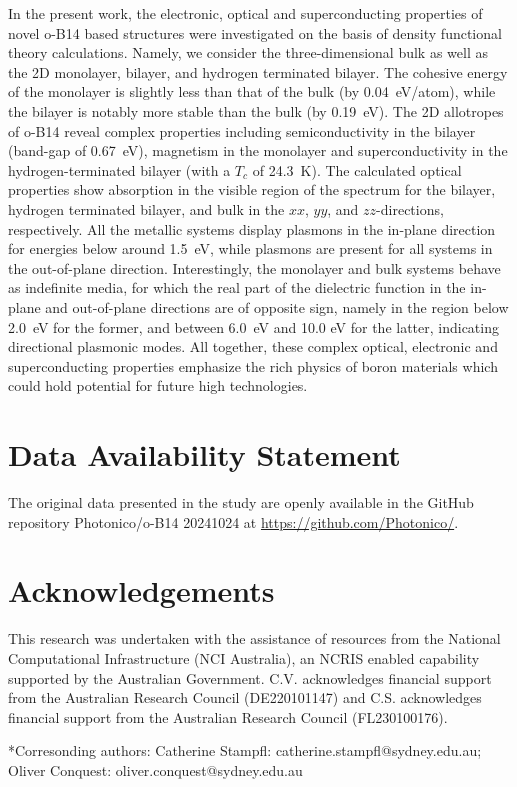 \documentclass[aps,prb,preprint,notitlepage]{revtex4-2}
\begin{document}
In the present work, the electronic, optical and superconducting properties of
novel o-B14 based structures were investigated on the basis of 
density functional theory calculations. Namely, we consider the three-dimensional
bulk as well as the 2D monolayer, bilayer, and 
hydrogen terminated bilayer. 
The cohesive energy of the monolayer is slightly less 
than that of the bulk (by 0.04~eV/atom), while the bilayer is notably more 
stable than the bulk (by 0.19~eV).
The 2D allotropes of o-B14 reveal complex properties including
semiconductivity in the bilayer (band-gap of 0.67~eV), 
magnetism in the monolayer 
and superconductivity in the hydrogen-terminated bilayer (with a $T_c$ of 24.3~K). 
The calculated optical properties show  absorption in the visible region 
of the spectrum for the bilayer, hydrogen terminated bilayer, and bulk in the $xx$, $yy$, and $zz$-directions, respectively.
All the metallic systems display plasmons in the in-plane direction for energies below around 1.5~eV, while plasmons are present for all systems in the out-of-plane direction. Interestingly, the monolayer and bulk 
systems behave as indefinite media, for which the real part of the dielectric
function in the in-plane and 
out-of-plane directions are of
opposite sign, namely in the region below 2.0~eV for the former, and 
between 6.0~eV and 10.0 eV for the latter, indicating directional 
plasmonic modes.
All together, these complex optical, electronic and superconducting 
properties emphasize the rich physics of boron materials which 
could hold potential for future high technologies. 



\section{Data Availability Statement}
The original data presented in the study are openly available in the 
GitHub repository 
Photonico/o-B14 20241024
at \url{https://github.com/Photonico/}.
\section{Acknowledgements}
This research was undertaken with the assistance of resources from the National Computational Infrastructure (NCI Australia), an NCRIS enabled capability supported by the Australian Government.
C.V. acknowledges financial support from the Australian Research Council 
(DE220101147) and 
C.S. acknowledges financial support from the Australian Research Council 
(FL230100176).

*Corresonding authors: Catherine Stampfl: catherine.stampfl@sydney.edu.au; Oliver Conquest: oliver.conquest@sydney.edu.au




\end{document}
